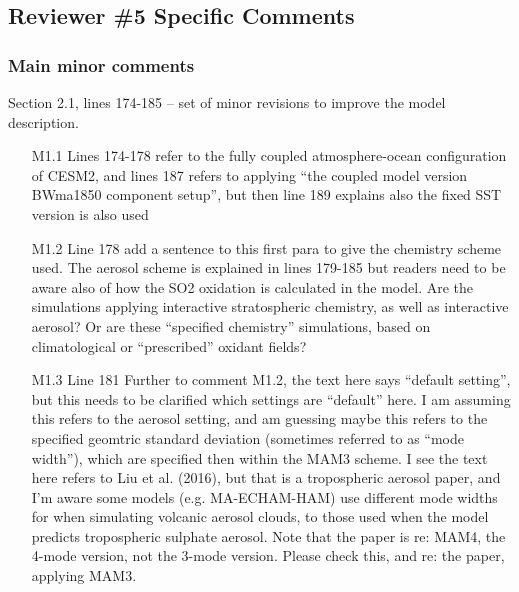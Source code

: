 \documentclass{reviewresponse}
\let\citeA\shortciteA %
\begin{document}
  \subsection*{Reviewer \#5 Specific Comments}

  \subsubsection*{Main minor comments}

  \begin{revcomment}[after title={: M1},colframe={colorcommentresolved}]
    Section 2.1, lines 174-185 -- set of minor revisions to improve the model
    description.

    \begin{enumerate}
      \item
      [M1.1] Lines 174-178 refer to the fully coupled atmosphere-ocean configuration of
      CESM2, and lines 187 refers to applying ``the coupled model version BWma1850
      component setup'', but then line 189 explains also the fixed SST version is also
      used
      \item
      [M1.2] Line 178 add a sentence to this first para to give the chemistry scheme
      used. The aerosol scheme is explained in lines 179-185 but readers need to be
      aware also of how the SO2 oxidation is calculated in the model. Are the
      simulations applying interactive stratospheric chemistry, as well as interactive
      aerosol? Or are these ``specified chemistry'' simulations, based on climatological
      or ``prescribed'' oxidant fields?
      \item
      [M1.3] Line 181 Further to comment M1.2, the text here says ``default setting'',
      but this needs to be clarified which settings are ``default'' here. I am assuming
      this refers to the aerosol setting, and am guessing maybe this refers to the
      specified geomtric standard deviation (sometimes referred to as ``mode width''),
      which are specified then within the MAM3 scheme. I see the text here refers to Liu
      et al. (2016), but that is a tropospheric aerosol paper, and I'm aware some models
      (e.g. MA-ECHAM-HAM) use different mode widths for when simulating volcanic aerosol
      clouds, to those used when the model predicts tropospheric sulphate aerosol. Note
      that the \citeA{liu2016} paper is re: MAM4, the 4-mode version, not the 3-mode
      version. Please check this, and re: the \citeA{mills2017} paper, applying MAM3.


\end{enumerate}
\end{revcomment}
\end{document}
